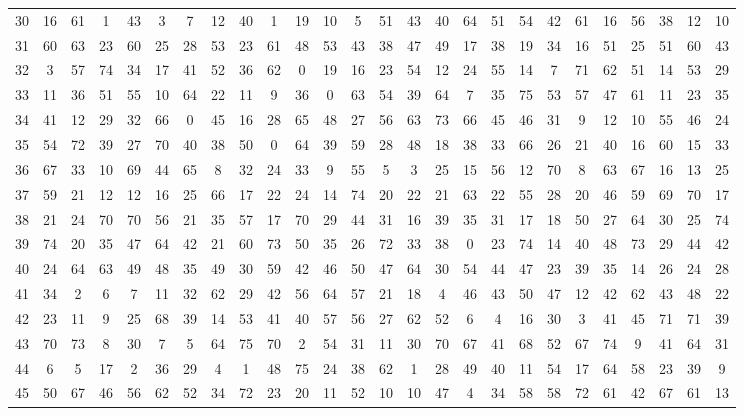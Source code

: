 \begin{table}
\begin{tabular}{c c c c c c c c c c c c c c c c c c c c c c c c c c }
30 & 16 & 61 & 1 & 43 & 3 & 7 & 12 & 40 & 1 & 19 & 10 & 5 & 51 & 43 & 40 & 64 & 51 & 54 & 42 & 61 & 16 & 56 & 38 & 12 & 10 \\
31 & 60 & 63 & 23 & 60 & 25 & 28 & 53 & 23 & 61 & 48 & 53 & 43 & 38 & 47 & 49 & 17 & 38 & 19 & 34 & 16 & 51 & 25 & 51 & 60 & 43 \\
32 & 3 & 57 & 74 & 34 & 17 & 41 & 52 & 36 & 62 & 0 & 19 & 16 & 23 & 54 & 12 & 24 & 55 & 14 & 7 & 71 & 62 & 51 & 14 & 53 & 29 \\
33 & 11 & 36 & 51 & 55 & 10 & 64 & 22 & 11 & 9 & 36 & 0 & 63 & 54 & 39 & 64 & 7 & 35 & 75 & 53 & 57 & 47 & 61 & 11 & 23 & 35 \\
34 & 41 & 12 & 29 & 32 & 66 & 0 & 45 & 16 & 28 & 65 & 48 & 27 & 56 & 63 & 73 & 66 & 45 & 46 & 31 & 9 & 12 & 10 & 55 & 46 & 24 \\
35 & 54 & 72 & 39 & 27 & 70 & 40 & 38 & 50 & 0 & 64 & 39 & 59 & 28 & 48 & 18 & 38 & 33 & 66 & 26 & 21 & 40 & 16 & 60 & 15 & 33 \\
36 & 67 & 33 & 10 & 69 & 44 & 65 & 8 & 32 & 24 & 33 & 9 & 55 & 5 & 3 & 25 & 15 & 56 & 12 & 70 & 8 & 63 & 67 & 16 & 13 & 25 \\
37 & 59 & 21 & 12 & 12 & 16 & 25 & 66 & 17 & 22 & 24 & 14 & 74 & 20 & 22 & 21 & 63 & 22 & 55 & 28 & 20 & 46 & 59 & 69 & 70 & 17 \\
38 & 21 & 24 & 70 & 70 & 56 & 21 & 35 & 57 & 17 & 70 & 29 & 44 & 31 & 16 & 39 & 35 & 31 & 17 & 18 & 50 & 27 & 64 & 30 & 25 & 74 \\
39 & 74 & 20 & 35 & 47 & 64 & 42 & 21 & 60 & 73 & 50 & 35 & 26 & 72 & 33 & 38 & 0 & 23 & 74 & 14 & 40 & 48 & 73 & 29 & 44 & 42 \\
40 & 24 & 64 & 63 & 49 & 48 & 35 & 49 & 30 & 59 & 42 & 46 & 50 & 47 & 64 & 30 & 54 & 44 & 47 & 23 & 39 & 35 & 14 & 26 & 24 & 28 \\
41 & 34 & 2 & 6 & 7 & 11 & 32 & 62 & 29 & 42 & 56 & 64 & 57 & 21 & 18 & 4 & 46 & 43 & 50 & 47 & 12 & 42 & 62 & 43 & 48 & 22 \\
42 & 23 & 11 & 9 & 25 & 68 & 39 & 14 & 53 & 41 & 40 & 57 & 56 & 27 & 62 & 52 & 6 & 4 & 16 & 30 & 3 & 41 & 45 & 71 & 71 & 39 \\
43 & 70 & 73 & 8 & 30 & 7 & 5 & 64 & 75 & 70 & 2 & 54 & 31 & 11 & 30 & 70 & 67 & 41 & 68 & 52 & 67 & 74 & 9 & 41 & 64 & 31 \\
44 & 6 & 5 & 17 & 2 & 36 & 29 & 4 & 1 & 48 & 75 & 24 & 38 & 62 & 1 & 28 & 49 & 40 & 11 & 54 & 17 & 64 & 58 & 23 & 39 & 9 \\
45 & 50 & 67 & 46 & 56 & 62 & 52 & 34 & 72 & 23 & 20 & 11 & 52 & 10 & 10 & 47 & 4 & 34 & 58 & 58 & 72 & 61 & 42 & 67 & 61 & 13 \\

\end{tabular}
\end{table}

